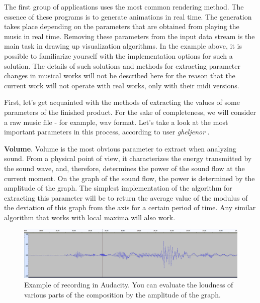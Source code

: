 \documentclass[thesis=B,english]{FITthesis}[2019/12/23]
\begin{document}
The first group of applications uses the most common rendering method. The essence of these programs is to generate animations in real time. The generation takes place depending on the parameters that are obtained from playing the music in real time. Removing these parameters from the input data stream is the main task in drawing up visualization algorithms. In the example above, it is possible to familiarize yourself with the implementation options for such a solution. The details of such solutions and methods for extracting parameter changes in musical works will not be described here for the reason that the current work will not operate with real works, only with their midi versions.

First, let's get acquainted with the methods of extracting the values of some parameters of the finished product. For the sake of completeness, we will consider a raw music file - for example, wav format. Let's take a look at the most important parameters in this process, according to user \textit{gheljenor} \cite{yandex_gheljenor}.

\textbf{Volume}. Volume is the most obvious parameter to extract when analyzing sound. From a physical point of view, it characterizes the energy transmitted by the sound wave, and, therefore, determines the power of the sound flow at the current moment. On the graph of the sound flow, the power is determined by the amplitude of the graph. The simplest implementation of the algorithm for extracting this parameter will be to return the average value of the modulus of the deviation of this graph from the axis for a certain period of time. Any similar algorithm that works with local maxima will also work.

\begin{figure}[ht]
            \includegraphics[width=\textwidth]{audacity_1.png}
            \caption[Audacity recording - volume]{Example of recording in Audacity. You can evaluate the loudness of various parts of the composition by the amplitude of the graph.}
            \label{fig:audacity_1}
\end{figure}
\end{document}
